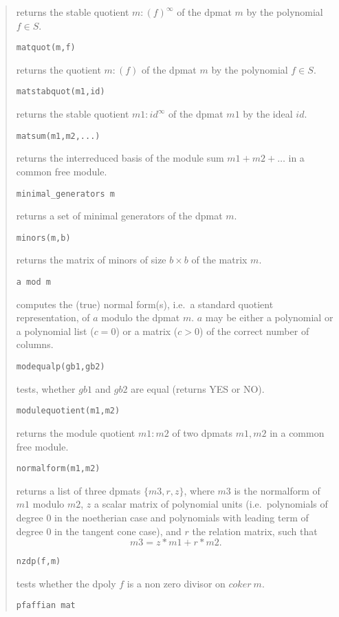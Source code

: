 \documentclass[a4paper,11pt]{article}
\newcommand{\pbx}[1]{\mbox{}\hfill \parbox[t]{12cm}{#1} \pagebreak[3]}
\begin{document}
\begin{quote}
\pbx{returns the stable quotient $m:(f)^\infty$ of the dpmat $m$ by
the polynomial $f\in S$.}

\verb|matquot(m,f)| 

\pbx{returns the quotient $m:(f)$ of the dpmat $m$ by the polynomial
$f\in S$.}

\verb|matstabquot(m1,id)| 

\pbx{returns the stable quotient $m1:id^\infty$ of the dpmat $m1$ by
the ideal $id$.}

\verb|matsum(m1,m2,...)| 

\pbx{returns the interreduced basis of the module sum $m1+m2+\ldots$
in a common free module.}

\verb|minimal_generators m| 

\pbx{returns a set of minimal generators of the dpmat $m$.}

\verb|minors(m,b)| 

\pbx{returns the matrix of minors of size $b\times b$ of the matrix
$m$.}  

\verb|a mod m| 

\pbx{computes the (true) normal form(s), i.e.\ a standard quotient
representation, of $a$ modulo the dpmat $m$. $a$ may be either a
polynomial or a polynomial list ($c=0$) or a matrix ($c>0$) of the
correct number of columns.} 

\verb|modequalp(gb1,gb2)| 

\pbx{tests, whether $gb1$ and $gb2$ are equal (returns YES or NO).}

\verb|modulequotient(m1,m2)| 

\pbx{returns the module quotient $m1:m2$ of two dpmats $m1,m2$ in a
common free module.}

\verb|normalform(m1,m2)| 

\pbx{returns a list of three dpmats $\{m3,r,z\}$, where $m3$ is the
normalform of $m1$ modulo $m2$, $z$ a scalar matrix of polynomial
units (i.e.\ polynomials of degree 0 in the noetherian case and
polynomials with leading term of degree 0 in the tangent cone case),
and $r$ the relation matrix, such that \[m3=z*m1+r*m2.\]}

\verb|nzdp(f,m)| 

\pbx{tests whether the dpoly $f$ is a non zero divisor on $coker\
m$.} 

\verb|pfaffian mat| 


\end{quote}
\end{document}
